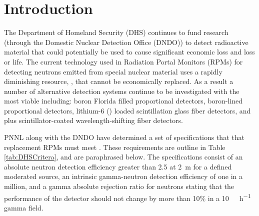 \documentclass[draftcls,onecolumn]{IEEEtran}
\begin{document}
\section{Introduction}
\label{sec:Intro}
The Department of Homeland Security (DHS) continues to fund research (through the Domestic Nuclear Detection Office (DNDO)) to detect radioactive material that could potentially be used to cause significant economic loss and loss or life.  
The current technology used in Radiation Portal Monitors (RPMs) for detecting neutrons emitted from special nuclear material uses a rapidly diminishing resource, , that cannot be economically replaced. 
As a result a number of alternative detection systems continue to be investigated with the most viable including: boron Florida  filled proportional detectors, boron-lined proportional detectors, lithium-6 () loaded scintillation glass fiber detectors, and  plus scintillator-coated wavelength-shifting fiber detectors\cite{pnnl_18471,kouzes_neutron_2010}.  

PNNL along with the DNDO have determined a set of specifications that that replacement RPMs must meet \cite{kouzes_neutron_2010, kouzes_neutron_1999}. 
These requirements are outline in Table \ref{tab:DHSCritera}, and are paraphrased below.
The specifications consist of an absolute neutron detection efficiency greater than \SI{2.5}{\cps} at \SI{2}{\meter} for a defined moderated source, an intrinsic gamma-neutron detection efficiency of one in a million, and a gamma absolute rejection ratio for neutrons stating that the performance of the detector should not change by more than 10\% in a \SI{10}{\milli\roetgen\per\hour} gamma field.
\end{document}
